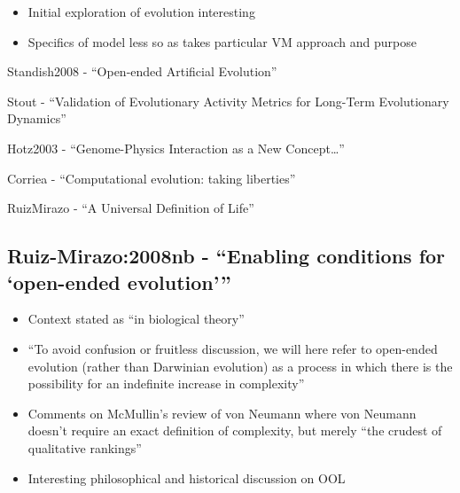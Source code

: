 		\begin{itemize}
			\item
			
			Initial exploration of evolution interesting
			
			\item
			
			Specifics of model less so as takes particular VM approach and purpose
			
		\end{itemize}
		
		Standish2008 - ``Open-ended Artificial Evolution''
		
		Stout - ``Validation of Evolutionary Activity Metrics for Long-Term
		Evolutionary Dynamics''
		
		Hotz2003 - ``Genome-Physics Interaction as a New Concept\ldots{}''
		
		Corriea - ``Computational evolution: taking liberties''
		
		RuizMirazo - ``A Universal Definition of Life''
		
		\hypertarget{ruiz-mirazo2008nb---enabling-conditions-for-open-ended-evolution}{\subsection{Ruiz-Mirazo:2008nb
				- ``Enabling conditions for `open-ended
				evolution'''}\label{ruiz-mirazo2008nb---enabling-conditions-for-open-ended-evolution}}
		
		\begin{itemize}
			\item
			
			Context stated as ``in biological theory''
			
			\item
			
			``To avoid confusion or fruitless discussion, we will here refer to
			open-ended evolution (rather than Darwinian evolution) as a process in
			which there is the possibility for an indefinite increase in
			complexity''
			
			\item
			
			Comments on McMullin's review of von Neumann where von Neumann doesn't
			require an exact definition of complexity, but merely ``the crudest of
			qualitative rankings''
			
			\item
			
			Interesting philosophical and historical discussion on OOL
			
		\end{itemize}
		
